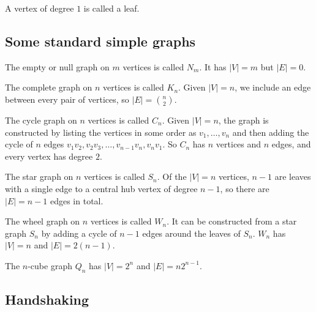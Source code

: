 \documentclass[10pt, a4paper]{article}
\begin{document}
\begin{definition}[Leaf]
    A vertex of degree $1$ is called a leaf.
\end{definition}

\subsection{Some standard simple graphs}
\begin{definition}
    The empty or null graph on $m$ vertices is called $N_m$.
    It has $|V| = m$ but $|E| = 0$.
\end{definition}

\begin{definition}
    The complete graph on $n$ vertices is called $K_n$.
    Given $|V| = n$,
    we include an edge between every pair of vertices,
    so $|E| = \binom{n}{2}$.
\end{definition}

\begin{definition}
    The cycle graph on $n$ vertices is called $C_n$.
    Given $|V| = n$,
    the graph is constructed by listing the vertices in some order as $v_1, \dotsc, v_n$ and then adding the cycle of $n$ edges $v_1v_2, v_2v_3, \dotsc, v_{n - 1}v_n, v_nv_1$.
    So $C_n$ has $n$ vertices and $n$ edges,
    and every vertex has degree $2$.
\end{definition}

\begin{definition}
    The star graph on $n$ vertices is called $S_n$.
    Of the $|V| = n$ vertices,
    $n - 1$ are leaves with a single edge to a central hub vertex of degree $n - 1$,
    so there are $|E| = n - 1$ edges in total.
\end{definition}

\begin{definition}
    The wheel graph on $n$ vertices is called $W_n$.
    It can be constructed from a star graph $S_n$ by adding a cycle of $n - 1$ edges around the leaves of $S_n$.
    $W_n$ has $|V| = n$ and $|E| = 2(n - 1)$.
\end{definition}

\begin{definition}
    The $n$-cube graph $Q_n$ has $|V| = 2 ^ n$ and $|E| = n2 ^ {n - 1}$.
\end{definition}

\subsection{Handshaking}
\end{document}

